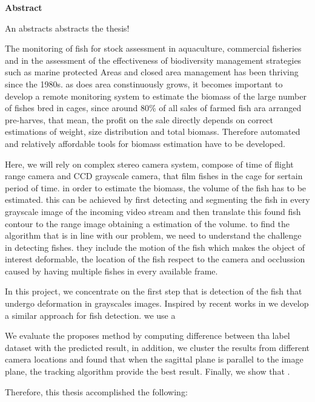 

\clearemptydoublepage
{}
{}	





\vspace*{2cm}
\begin{center}
{\Large \bf Abstract}
\end{center}
\vspace{1cm}

An abstracts abstracts the thesis!

The monitoring of fish for stock assessment in aquaculture, commercial fisheries and in the assessment of the effectiveness of biodiversity management strategies such as marine protected Areas and closed area management has been thriving since the 1980s.
as does area constinuously grows, 
it becomes important to develop a remote monitoring system to estimate the biomass of the large number of fishes bred in cages,
since around 80\% of all sales of farmed fish ara arranged pre-harves,
that mean, the profit on the sale directly depends on correct estimations of weight,
size distribution and total biomass.
Therefore automated and relatively affordable tools for biomass estimation have to be developed.

Here, we will rely on complex stereo camera system,
compose of time of flight range camera and CCD grayscale camera,
that film fishes in the cage for sertain period of time.
in order to estimate the biomass, the volume of the fish has to be estimated. this can be achieved by first detecting and segmenting the fish in every grayscale image of the incoming video stream and then translate this found fish contour  to the range image obtaining a estimation of the volume.
to find the algorithm that is in line with our problem,
we need to understand the challenge in detecting fishes.
they include the motion of the fish which makes the object of interest deformable,
the location of the fish respect to the camera and occlussion caused by having multiple fishes in every available frame.

In this project, we concentrate on the first step that is detection of the fish that undergo deformation in grayscales images.
Inspired by recent works in  
we develop a similar approach for fish detection. we use a 

We evaluate the proposes method by computing difference between tha label dataset with the predicted result,
in addition, we cluster the results from different camera locations and found that when the sagittal plane is parallel to the image plane,
the tracking algorithm provide the best result.
Finally, we show that .

Therefore, this thesis accomplished the following:
